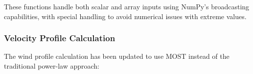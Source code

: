 \documentclass{article}
\begin{document}
\begin{Shaded}
\begin{Highlighting}[]
\OperatorTok{=}
\OperatorTok{=}\NormalTok{, } \OperatorTok{{-}}  \OperatorTok{*}
\OperatorTok{=}
\OperatorTok{=}\NormalTok{)    }
    
\OperatorTok{=}  \OperatorTok{*} \OperatorTok{+}\OperatorTok{/} \NormalTok{)}
\OperatorTok{=} \OperatorTok{+}\OperatorTok{**}\NormalTok{) }\OperatorTok{/} \NormalTok{)}
\OperatorTok{=} \OperatorTok{{-}} \OperatorTok{*}
\OperatorTok{=}\OperatorTok{+}\OperatorTok{+}\OperatorTok{+}\OperatorTok{/} 
\OperatorTok{=}

\end{Highlighting}
\end{Shaded}

These functions handle both scalar and array inputs using NumPy's
broadcasting capabilities, with special handling to avoid numerical
issues with extreme values.

\hypertarget{velocity-profile-calculation}{%
\subsubsection{Velocity Profile
Calculation}\label{velocity-profile-calculation}}

The wind profile calculation has been updated to use MOST instead of the
traditional power-law approach:
\end{document}
